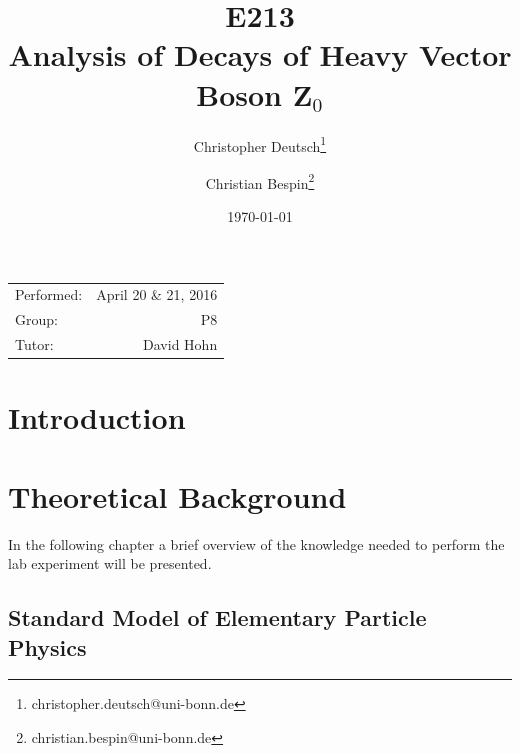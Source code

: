 \documentclass[11pt, a4paper]{article}
\title{E213 \\ Analysis of Decays of Heavy Vector Boson Z$_0$}
\author{Christopher Deutsch\footnote{christopher.deutsch@uni-bonn.de} \and Christian Bespin\footnote{christian.bespin@uni-bonn.de}}
\date{\today}
\numberwithin{equation}{section}
\begin{document}
\begin{titlepage}

\maketitle

\begin{center}
\begin{tabular}{l r}
Performed: & April 20 \& 21, 2016 \\
Group: & P8 \\
Tutor: & David Hohn
\end{tabular}
\end{center}

\begin{abstract}
	\noindent 
\end{abstract}

\end{titlepage}

\tableofcontents
\newpage

\section{Introduction}



\section{Theoretical Background}

In the following chapter a brief overview of the knowledge needed to perform the lab experiment will be presented.

\subsection{Standard Model of Elementary Particle Physics}
\end{document}
